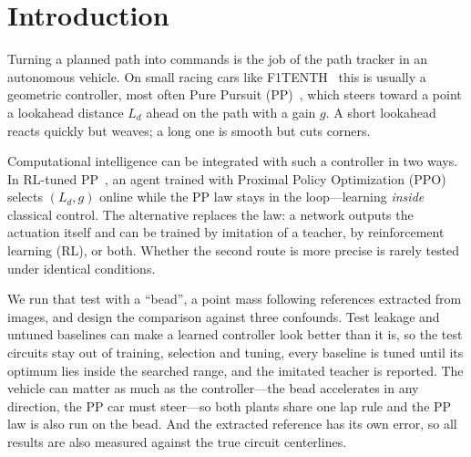 \documentclass{IJCAS}
\begin{document}


\section{Introduction}
Turning a planned path into commands is the job of the path tracker in an autonomous vehicle. On small racing cars like F1TENTH~\cite{okelly2020} this is usually a geometric controller, most often Pure Pursuit (PP)~\cite{coulter1992,snider2009}, which steers toward a point a lookahead distance $L_d$ ahead on the path with a gain $g$. A short lookahead reacts quickly but weaves; a long one is smooth but cuts corners.

Computational intelligence can be integrated with such a controller in two ways. In RL-tuned PP~\cite{elgouhary2026}, an agent trained with Proximal Policy Optimization (PPO)~\cite{schulman2017} selects $(L_d,g)$ online while the PP law stays in the loop---learning \emph{inside} classical control. The alternative replaces the law: a network outputs the actuation itself and can be trained by imitation of a teacher, by reinforcement learning (RL), or both. Whether the second route is more precise is rarely tested under identical conditions.

We run that test with a ``bead'', a point mass following references extracted from images, and design the comparison against three confounds. Test leakage and untuned baselines can make a learned controller look better than it is, so the test circuits stay out of training, selection and tuning, every baseline is tuned until its optimum lies inside the searched range, and the imitated teacher is reported. The vehicle can matter as much as the controller---the bead accelerates in any direction, the PP car must steer---so both plants share one lap rule and the PP law is also run on the bead. And the extracted reference has its own error, so all results are also measured against the true circuit centerlines.
\end{document}
